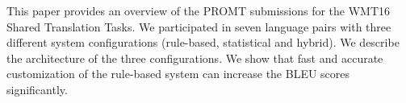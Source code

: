 This paper provides an overview of the PROMT submissions for the WMT16 Shared Translation Tasks. We participated in seven language pairs with three different system configurations (rule-based, statistical and hybrid). We describe the architecture of the three configurations. We show that fast and accurate customization of the rule-based system can increase the BLEU scores significantly.
